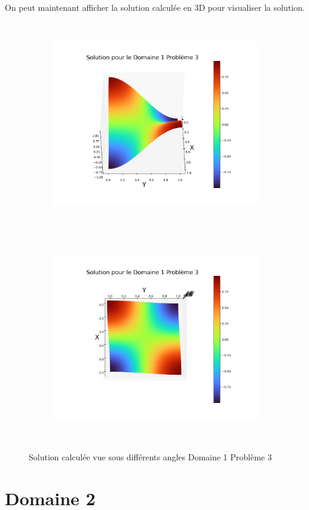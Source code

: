 \documentclass[a4paper, 12pt, french]{report}
\begin{document}
On peut maintenant afficher la solution calculée en 3D pour visualiser la solution.
\begin{figure}[!h]
    \centering
    \begin{subfigure}{0.48\textwidth}
    	\centering
        \includegraphics[height=9cm]{../Images/Figures_Calculees/sol3D13.png}
    \end{subfigure}
    \begin{subfigure}{0.48\textwidth}
    \centering
        \includegraphics[height=9cm]{../Images/Figures_Calculees/sol3DVH13.png}
    \end{subfigure}
    \caption{Solution calculée vue sous différents angles Domaine 1 Problème 3 }
\end{figure}
\newpage

\section{Domaine 2}
\end{document}
